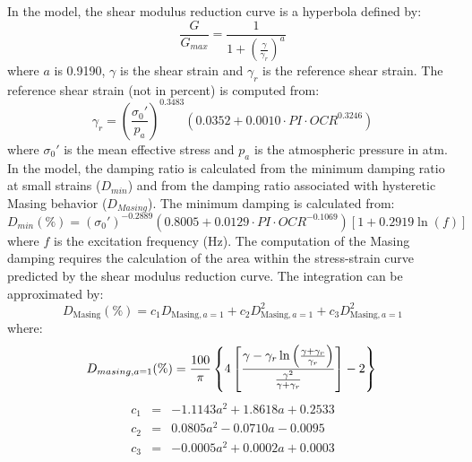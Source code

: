 \documentclass[12pt,oneside]{book}
\begin{document}
In the \citet{darendeli:01} model, the shear modulus reduction curve is a hyperbola defined by:
\begin{equation}
    \frac{G}{G_{max}} = \frac{1}{1 + \left( \frac{\gamma}{\gamma_r} \right)^{a}}
    \label{eq:shearmod}
\end{equation}
where $a$ is 0.9190, $\gamma$ is the shear strain and $\gamma_r$ is the reference shear strain.  The reference
shear strain (not in percent) is computed from:
\begin{equation}
    \gamma_r = \left(\frac{\sigma_0'}{p_a}\right)^{0.3483} \left( 0.0352 + 0.0010 \cdot PI \cdot OCR^{0.3246} \right)
\end{equation}
where $\sigma_0'$ is the mean effective stress and $p_a$ is the atmospheric pressure in atm. In the
model, the damping ratio is calculated from the minimum damping ratio at small strains ($D_{min}$)
and from the damping ratio associated with hysteretic Masing behavior ($D_{Masing}$).  The minimum
damping is calculated from:
\begin{equation}
    D_{min}(\%) = (\sigma_0')^{-0.2889} \left( 0.8005 + 0.0129 \cdot PI \cdot OCR ^{-0.1069} \right) \left[
    1 + 0.2919 \ln\left( f \right) \right]
    \label{eq:dmin}
\end{equation}
where $f$ is the excitation frequency (Hz). The computation of the Masing damping requires the
calculation of the area within the stress-strain curve predicted by the shear modulus reduction
curve.  The integration can be approximated by:
\begin{equation}
    D_\text{Masing}(\%) = c_1 D_{\text{Masing},a=1} + c_2 D_{\text{Masing},a=1}^2 + c_3
    D_{\text{Masing},a=1}^2
    \label{eq:dmasing}
\end{equation}
where:
\begin{equation}
    D_{masing,a=1}(\%) = \frac{100}{\pi} \left\{ 4 \left[ \frac{\gamma - \gamma_r\ln\left( \frac{\gamma +
    \gamma_r}{\gamma_r} \right)}{\frac{\gamma^2}{\gamma+\gamma_r}} \right] - 2 \right\} \\
\end{equation}
\begin{equation}
    \begin{array}{rcl}
        c_1 & = & -1.1143 a^2 + 1.8618 a + 0.2533 \\
        c_2 & = & 0.0805 a^2 - 0.0710 a - 0.0095 \\
        c_3 & = & -0.0005 a^2 + 0.0002 a + 0.0003 \\
    \end{array}
\end{equation}
\end{document}
